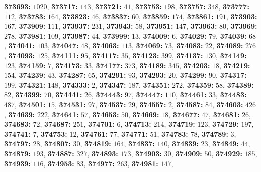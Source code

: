 \textsf{\bfseries 373693:} $1020$, \textsf{\bfseries 373717:} $143$, \textsf{\bfseries 373721:} $41$, \textsf{\bfseries 373753:} $198$, \textsf{\bfseries 373757:} $348$, \textsf{\bfseries 373777:} $112$, \textsf{\bfseries 373783:} $164$, \textsf{\bfseries 373823:} $46$, \textsf{\bfseries 373837:} $60$, \textsf{\bfseries 373859:} $174$, \textsf{\bfseries 373861:} $191$, \textsf{\bfseries 373903:} $167$, \textsf{\bfseries 373909:} $111$, \textsf{\bfseries 373937:} $231$, \textsf{\bfseries 373943:} $58$, \textsf{\bfseries 373951:} $147$, \textsf{\bfseries 373963:} $80$, \textsf{\bfseries 373969:} $278$, \textsf{\bfseries 373981:} $109$, \textsf{\bfseries 373987:} $44$, \textsf{\bfseries 373999:} $13$, \textsf{\bfseries 374009:} $6$, \textsf{\bfseries 374029:} $79$, \textsf{\bfseries 374039:} $68$, \textsf{\bfseries 374041:} $103$, \textsf{\bfseries 374047:} $48$, \textsf{\bfseries 374063:} $113$, \textsf{\bfseries 374069:} $73$, \textsf{\bfseries 374083:} $22$, \textsf{\bfseries 374089:} $276$, \textsf{\bfseries 374093:} $125$, \textsf{\bfseries 374111:} $95$, \textsf{\bfseries 374117:} $35$, \textsf{\bfseries 374123:} $399$, \textsf{\bfseries 374137:} $130$, \textsf{\bfseries 374149:} $123$, \textsf{\bfseries 374159:} $7$, \textsf{\bfseries 374173:} $33$, \textsf{\bfseries 374177:} $373$, \textsf{\bfseries 374189:} $345$, \textsf{\bfseries 374203:} $18$, \textsf{\bfseries 374219:} $154$, \textsf{\bfseries 374239:} $43$, \textsf{\bfseries 374287:} $65$, \textsf{\bfseries 374291:} $93$, \textsf{\bfseries 374293:} $20$, \textsf{\bfseries 374299:} $90$, \textsf{\bfseries 374317:} $199$, \textsf{\bfseries 374321:} $148$, \textsf{\bfseries 374333:} $2$, \textsf{\bfseries 374347:} $187$, \textsf{\bfseries 374351:} $272$, \textsf{\bfseries 374359:} $58$, \textsf{\bfseries 374389:} $82$, \textsf{\bfseries 374399:} $70$, \textsf{\bfseries 374441:} $26$, \textsf{\bfseries 374443:} $97$, \textsf{\bfseries 374447:} $110$, \textsf{\bfseries 374461:} $33$, \textsf{\bfseries 374483:} $487$, \textsf{\bfseries 374501:} $15$, \textsf{\bfseries 374531:} $97$, \textsf{\bfseries 374537:} $29$, \textsf{\bfseries 374557:} $2$, \textsf{\bfseries 374587:} $84$, \textsf{\bfseries 374603:} $426$, \textsf{\bfseries 374639:} $222$, \textsf{\bfseries 374641:} $57$, \textsf{\bfseries 374653:} $50$, \textsf{\bfseries 374669:} $18$, \textsf{\bfseries 374677:} $47$, \textsf{\bfseries 374681:} $26$, \textsf{\bfseries 374683:} $72$, \textsf{\bfseries 374687:} $251$, \textsf{\bfseries 374701:} $6$, \textsf{\bfseries 374713:} $214$, \textsf{\bfseries 374719:} $123$, \textsf{\bfseries 374729:} $197$, \textsf{\bfseries 374741:} $7$, \textsf{\bfseries 374753:} $12$, \textsf{\bfseries 374761:} $77$, \textsf{\bfseries 374771:} $51$, \textsf{\bfseries 374783:} $78$, \textsf{\bfseries 374789:} $3$, \textsf{\bfseries 374797:} $28$, \textsf{\bfseries 374807:} $30$, \textsf{\bfseries 374819:} $164$, \textsf{\bfseries 374837:} $140$, \textsf{\bfseries 374839:} $23$, \textsf{\bfseries 374849:} $44$, \textsf{\bfseries 374879:} $193$, \textsf{\bfseries 374887:} $327$, \textsf{\bfseries 374893:} $173$, \textsf{\bfseries 374903:} $30$, \textsf{\bfseries 374909:} $50$, \textsf{\bfseries 374929:} $185$, \textsf{\bfseries 374939:} $116$, \textsf{\bfseries 374953:} $83$, \textsf{\bfseries 374977:} $263$, \textsf{\bfseries 374981:} $147$, 
